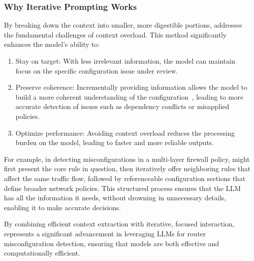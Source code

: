 \subsubsection{Why Iterative Prompting Works}
By breaking down the context into smaller, more digestible portions, \sysname{} addresses the fundamental challenges of context overload. This method significantly enhances the model’s ability to:
\begin{enumerate}
    \item Stay on target: With less irrelevant information, the model can maintain focus on the specific configuration issue under review.
    \item Preserve coherence: Incrementally providing information allows the model to build a more coherent understanding of the configuration~\cite{li2023prompt,subramonyam2024bridging}, leading to more accurate detection of issues such as dependency conflicts or misapplied policies.
    \item Optimize performance: Avoiding context overload reduces the processing burden on the model, leading to faster and more reliable outputs.
\end{enumerate}

For example, in detecting misconfigurations in a multi-layer firewall policy, \sysname{} might first present the core rule in question, then iteratively offer neighboring rules that affect the same traffic flow, followed by referenceable configuration sections that define broader network policies. This structured process ensures that the LLM has all the information it needs, without drowning in unnecessary details, enabling it to make accurate decisions.

By combining efficient context extraction with iterative, focused interaction, \sysname{} represents a significant advancement in leveraging LLMs for router misconfiguration detection, ensuring that models are both effective and computationally efficient.